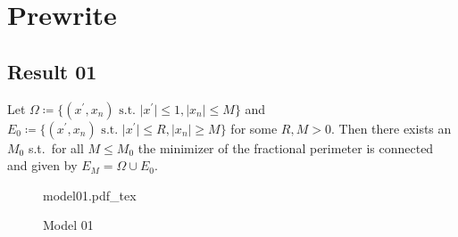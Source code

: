 \chapter{Prewrite}
\label{cha:prewrite}

\section{Result 01}
\label{sec:-02}

\begin{theorem}
	\label{thm:-01}
	Let \( \Omega \coloneqq \{(x^\prime, x_n) \text{ s.t. }\lvert x^\prime \rvert \leq
	1,\lvert x_n \rvert \leq M \} \) and \( E_0 \coloneqq \{ (x^\prime,x_n) \text{ s.t. }
	\lvert x^\prime \rvert \leq R, \lvert x_n \rvert \geq M \} \) for some \( R, M > 0 \).
	Then there exists an \( M_0 \) s.t.\ for all \( M \leq M_0 \) the minimizer of the
	fractional perimeter is connected and given by \( E_M = \Omega \cup E_0 \).
\end{theorem}

\begin{figure}[h]
	\centering
	\def\svgwidth{0.4\textwidth}
	{model01.pdf_tex}
	\caption{Model 01}
	\label{fig:-03}
\end{figure}

